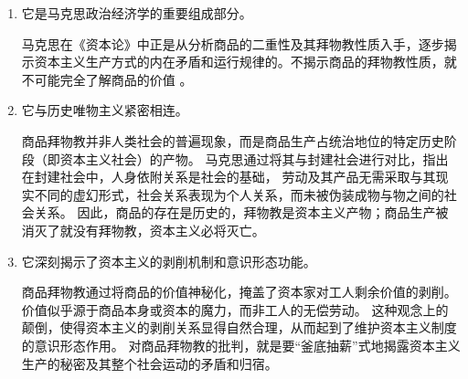 \begin{enumerate}
    \item 它是马克思政治经济学的重要组成部分。

    马克思在《资本论》中正是从分析商品的二重性及其拜物教性质入手，逐步揭示资本主义生产方式的内在矛盾和运行规律的。不揭示商品的拜物教性质，就不可能完全了解商品的价值 。  

    \item 它与历史唯物主义紧密相连。

    商品拜物教并非人类社会的普遍现象，而是商品生产占统治地位的特定历史阶段（即资本主义社会）的产物。
    马克思通过将其与封建社会进行对比，指出在封建社会中，人身依附关系是社会的基础，
    劳动及其产品无需采取与其现实不同的虚幻形式，社会关系表现为个人关系，而未被伪装成物与物之间的社会关系。
    因此，商品的存在是历史的，拜物教是资本主义产物；商品生产被消灭了就没有拜物教，资本主义必将灭亡。

    \item 它深刻揭示了资本主义的剥削机制和意识形态功能。

    商品拜物教通过将商品的价值神秘化，掩盖了资本家对工人剩余价值的剥削。
    价值似乎源于商品本身或资本的魔力，而非工人的无偿劳动。
    这种观念上的颠倒，使得资本主义的剥削关系显得自然合理，从而起到了维护资本主义制度的意识形态作用。
    对商品拜物教的批判，就是要“釜底抽薪”式地揭露资本主义生产的秘密及其整个社会运动的矛盾和归宿。
\end{enumerate}